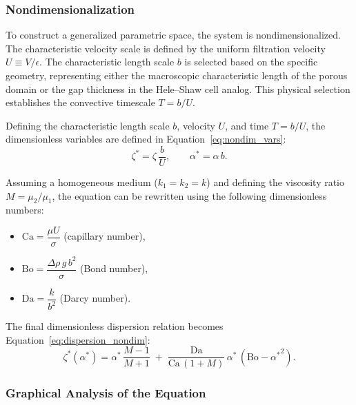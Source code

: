 \subsubsection{Nondimensionalization}

To construct a generalized parametric space, the system is nondimensionalized. The characteristic velocity scale is defined by the uniform filtration velocity $U \equiv V/\epsilon$. The characteristic length scale $b$ is selected based on the specific geometry, representing either the macroscopic characteristic length of the porous domain or the gap thickness in the Hele--Shaw cell analog. This physical selection establishes the convective timescale $T = b/U$.

Defining the characteristic length scale $b$, velocity $U$, and time $T = b/U$, the dimensionless variables are defined in Equation~\ref{eq:nondim_vars}:
\begin{equation} \label{eq:nondim_vars}
    \zeta^* = \zeta\,\frac{b}{U}, \qquad \alpha^* = \alpha\, b.
\end{equation}

Assuming a homogeneous medium ($k_1 = k_2 = k$) and defining the viscosity ratio $M = \mu_2/\mu_1$, the equation can be rewritten using the following dimensionless numbers:
\begin{itemize}
    \item $\mathrm{Ca} = \dfrac{\mu U}{\sigma}$ (capillary number),
    \item $\mathrm{Bo} = \dfrac{\Delta \rho\, g\, b^2}{\sigma}$ (Bond number),
    \item $\mathrm{Da} = \dfrac{k}{b^2}$ (Darcy number).
\end{itemize}

The final dimensionless dispersion relation becomes Equation~\ref{eq:dispersion_nondim}:
\begin{equation} \label{eq:dispersion_nondim}
    \zeta^*(\alpha^*) = \alpha^*\,\frac{M-1}{M+1}
    \;+\; \frac{\mathrm{Da}}{\mathrm{Ca}\,(1+M)}\,\alpha^*\,(\mathrm{Bo} - {\alpha^*}^2).
\end{equation}

\subsubsection{Graphical Analysis of the Equation}

